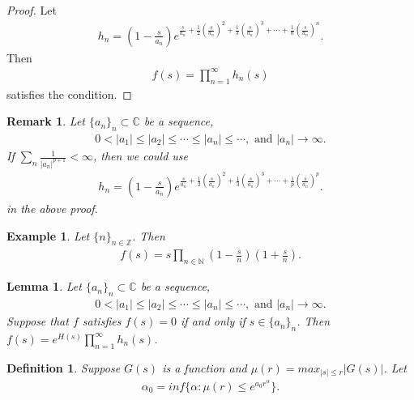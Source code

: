 \documentclass[a4paper,10pt]{amsart}
\newtheorem{example}{Example}[section]
\newtheorem{definition}{Definition}[section]
\newtheorem{lemma}{Lemma}[section]
\newtheorem{remark}{Remark}[section]
\newcommand{\C}{\mathbb C} %
\newcommand{\Z}{\mathbb Z} %
\newcommand{\N}{\mathbb N} %
\begin{document}
\begin{proof}
   Let 
   \begin{align*}
       h_{n} = (1 - \frac{s}{a_n})e^{\frac{s}{a_{n}}
           +\frac{1}{2}(\frac{s}{a_{n}})^{2} 
            +\frac{1}{3}(\frac{s}{a_{n}})^{3} + \cdots
        +\frac{1}{n}(\frac{s}{a_{n}})^{n}}.
   \end{align*}
   Then
   \begin{align*}
       f(s) = \prod_{n=1}^{\infty}h_{n}(s)   
   \end{align*}
   satisfies the condition.
\end{proof}

\begin{remark}
Let $\{a_{n}\}_{n} \subset \C$ be a sequence, 
\begin{align*}
    0 < |a_{1}| \leq |a_{2}| \leq \cdots \leq |a_{n}| \leq \cdots,
    \mbox{ and } |a_{n}| \rightarrow \infty.
\end{align*}
If $\sum_{n}\frac{1}{|a_{n}|^{p+1}} < \infty$, then we could 
use
\begin{align*}
       h_{n} = (1 - \frac{s}{a_n})e^{\frac{s}{a_{n}}
           +\frac{1}{2}(\frac{s}{a_{n}})^{2} 
            +\frac{1}{3}(\frac{s}{a_{n}})^{3} + \cdots
        +\frac{1}{p}(\frac{s}{a_{n}})^{p}}.
   \end{align*}
in the above proof.
\end{remark}

\begin{example}
    Let $\{n\}_{n \in \Z}$. Then
    \begin{align*}
        f(s) = s\prod_{n \in \N}(1-\frac{s}{n})(1+\frac{s}{n}).  
    \end{align*}
\end{example}

\begin{lemma}
Let $\{a_{n}\}_{n} \subset \C$ be a sequence, 
\begin{align*}
    0 < |a_{1}| \leq |a_{2}| \leq \cdots \leq |a_{n}| \leq \cdots,
    \mbox{ and } |a_{n}| \rightarrow \infty.
\end{align*}
Suppose that $f$ satisfies $f(s) = 0$ if and only if $s \in \{a_{n}\}_n$.
Then
$f(s) = e^{H(s)}\prod_{n=1}^{\infty}h_{n}(s)$.
\end{lemma}

\begin{definition}
    Suppose $G(s)$ is a function and $\mu(r) = max_{|s| \leq r}|G(s)|$.
    Let 
    \begin{align*}
        \alpha_{0} = inf\{\alpha : \mu(r) \leq e^{a_{0}r^{\alpha}}\}. 
    \end{align*}
\end{definition}
\end{document}
